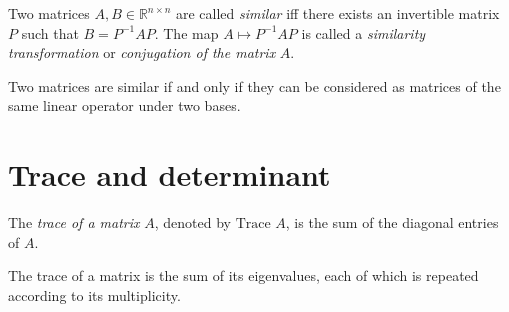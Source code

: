 \begin{defn}
  \label{def:similarMatrices}
  Two matrices $A, B\in \mathbb{R}^{n\times n}$
  are called \emph{similar} iff
  there exists an invertible matrix $P$
  such that $B=P^{-1}AP$.
  The map $A\mapsto P^{-1}AP$
  is called a \emph{similarity transformation}
  or \emph{conjugation of the matrix} $A$.
\end{defn}

\begin{rem}
  Two matrices are similar
  if and only if they can be considered
  as matrices of the same linear operator
  under two bases.
\end{rem}


\section{Trace and determinant}


\begin{defn}
  \label{def:trace}
  The \emph{trace of a matrix} $A$, denoted by $\text{Trace } A$,
  is the sum of the diagonal entries of $A$. 
\end{defn}

\begin{lem}
  \label{lem:trace}
  The trace of a matrix is the sum of its eigenvalues, 
  each of which is repeated according to its multiplicity.
\end{lem}


